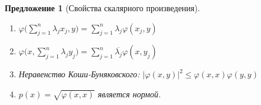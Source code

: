 \documentclass[11pt,openany,a4paper]{scrartcl}
\theoremstyle{plain}
\newtheorem{proposition}[theorem]{Предложение}
\theoremstyle{definition}
\newcommand\ol{\overline}
\begin{document}
\begin{proposition}[Свойства скалярного произведения]
\mbox{}
    \begin{enumerate}
        \item $\varphi\Big(\sum\limits_{j = 1}^n \lambda_jx_j, y\Big) =
        \sum\limits_{j=1}^n \lambda_j\varphi(x_j, y)$
        \item\label{scalar_product_halflinearity}
        $\varphi\Big(x, \sum\limits_{j = 1}^n \lambda_jy_j\Big) =
        \sum\limits_{j=1}^n \ol{\lambda_j}\varphi(x, y_j)$
        \item Неравенство Коши-Буняковского:
        $|\varphi(x, y)|^2 \leqslant \varphi(x, x)\varphi(y, y)$
        \item\label{scalar_product_norm} $p(x) = \sqrt{\varphi(x, x)}$
        является нормой.
    \end{enumerate}
\end{proposition}
\end{document}
